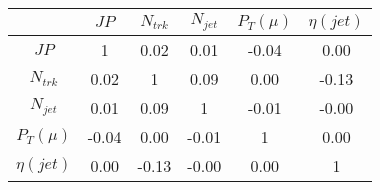 \begin{tabular}{|c|c|c|c|c|c|} 
\hline
 & $JP$ & $N_{trk}$ & $N_{jet}$ & $P_{T} (\mu)$ & $\eta (jet)$ \\ \hline
$JP$ & 1 & 0.02 & 0.01 & -0.04 & 0.00 \\
$N_{trk}$ & 0.02 & 1 & 0.09 & 0.00 & -0.13 \\
$N_{jet}$ & 0.01 & 0.09 & 1 & -0.01 & -0.00 \\
$P_{T} (\mu)$ & -0.04 & 0.00 & -0.01 & 1 & 0.00 \\
$\eta (jet)$ & 0.00 & -0.13 & -0.00 & 0.00 & 1 \\
\hline 
\end{tabular} 


